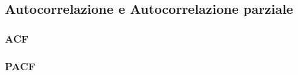 \subsection{Autocorrelazione e Autocorrelazione parziale}

\subsubsection{ACF}
\subsubsection{PACF}
